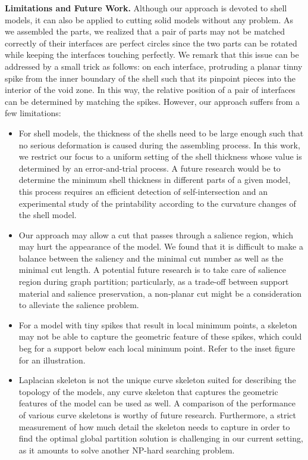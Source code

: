 \textbf{Limitations and Future Work.} Although our approach is devoted to shell models, it can also be applied to cutting solid models without any problem. As we assembled the parts, we realized that a pair of parts may not be matched correctly of their interfaces are perfect circles since the two parts can be rotated while keeping the interfaces touching perfectly. We remark that this issue can be addressed by a small trick as follows: on each interface, protruding a planar tinny spike from the inner boundary of the shell such that its pinpoint pieces into the interior of the void zone. In this way, the relative position of a pair of interfaces can be determined by matching the spikes. However, our approach suffers from a few limitations:
\begin{itemize}
 \item  For shell models, the thickness of the shells need to be large enough such that no serious deformation is caused during the assembling process. In this work, we restrict our focus to a uniform setting of the shell thickness whose value is determined by an error-and-trial process. A future research would be to determine the minimum shell thickness in different parts of a given model, this process requires an efficient detection of self-intersection and an experimental study of the printability according to the curvature changes of the shell model.
 \item  Our approach may allow a cut that passes through a salience region, which may hurt the appearance of the model. We found that it is difficult to make a balance between the saliency and the minimal cut number as well as the minimal cut length. A potential future research is to take care of salience region during graph partition; particularly, as a trade-off between support material and salience preservation, a non-planar cut might be a consideration to alleviate the salience problem.
 \item  For a model with tiny spikes that result in local minimum points, a skeleton may not be able to capture the geometric feature of these spikes, which could beg for a support below each local minimum point. Refer to the inset figure for an illustration.
 \item  Laplacian skeleton is not the unique curve skeleton suited for describing the topology of the models, any curve skeleton that captures the geometric features of the model can be used as well. A comparison of the performance of various curve skeletons is worthy of future research. Furthermore, a strict measurement of how much detail the skeleton needs to capture in order to find the optimal global partition solution is challenging in our current setting, as it amounts to solve another NP-hard searching problem.

\end{itemize}
